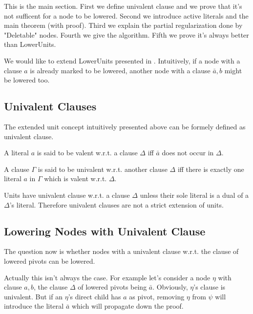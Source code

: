 \documentclass{llncs}
\newenvironment{jogo}{\color{teal}}{}
\begin{document}
\begin{jogo}
This is the main section. First we define univalent clause and we prove that it's not sufficent for a node to be lowered. Second we introduce active literals and the main theorem (with proof). Third we explain the partial regularization done by "Deletable" nodes. Fourth we give the algorithm. Fifth we prove it's always better than LowerUnits.
\end{jogo}

We would like to extend LowerUnits presented in \cite{LURPI}. Intuitively,
if a node with a clause $a$ is already marked to be lowered, another node with
a clause $\bar{a},b$ might be lowered too.

\subsection{Univalent Clauses}

The extended unit concept intuitively presented above can be formely defined as
univalent clause.

\begin{definition}
A literal $a$ is said to be valent w.r.t. a clause $\Delta$ iff $\bar{a}$ does
not occur in $\Delta$.
\end{definition}

\begin{definition}
A clause $\Gamma$ is said to be univalent w.r.t. another clause $\Delta$ iff
there is exactly one literal $a$ in $\Gamma$ which is valent w.r.t. $\Delta$.
\end{definition}

Units have univalent clause w.r.t. a clause $\Delta$ unless their sole literal
is a dual of a $\Delta$'s literal. Therefore univalent clauses are not a
strict extension of units.


\subsection{Lowering Nodes with Univalent Clause}

The question now is whether nodes with a univalent clause w.r.t. the clause of
lowered pivots can be lowered.

Actually this isn't always the case. For example let's consider a node
$\eta$ with clause $a,b$, the clause $\Delta$ of lowered pivots being
$\bar{a}$. Obviously, $\eta$'s clause is univalent. But if an $\eta$'s
direct child has $a$ as pivot, removing $\eta$ from $\psi$ will introduce
the literal $\bar{a}$ which will propagate down the proof.
\end{document}
